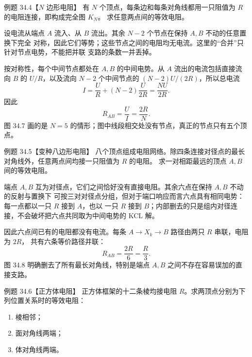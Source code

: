\Needspace{0.34\textheight}
\begin{origexamplebox}{例题 34.4【$N$ 边形电阻】}
有 $N$ 个顶点，每条边和每条对角线都用一只阻值为 $R$ 的电阻连接，即构成完全图 $K_N$。
求任意两点间的等效电阻。
\end{origexamplebox}

\begin{xesolution}
设电流从端点 $A$ 流入、从 $B$ 流出。其余 $N-2$ 个节点在保持 $A,B$ 不动的任意置换下完全
对称，因此它们等势；这些节点之间的电阻均无电流。这里的“合并”只针对节点电势，不能把并联
支路的条数一并丢掉。

按对称性，每个中间节点都处在 $A,B$ 的中间电势。从 $A$ 流出的电流包括直接流向 $B$ 的
$U/R$，以及流向 $N-2$ 个中间节点的 $(N-2)U/(2R)$，所以总电流
\[
  I=\frac UR+(N-2)\frac{U}{2R}=\frac{NU}{2R}.
\]
因此
\begin{equation}
  \boxed{R_{AB}=\frac UI=\frac{2R}{N}}.
\end{equation}
图 34.7 画的是 $N=5$ 的情形；图中线段相交处没有节点，真正的节点只有五个顶点。

\completeGraphDiagram
\end{xesolution}

\Needspace{0.38\textheight}
\begin{origexamplebox}{例题 34.5【变种八边形电阻】}
八个顶点组成电阻网络。除四条连接对径点的最长对角线外，任意两点间均接一只阻值为 $R$ 的电阻。
求一对相距最远的顶点 $A,B$ 间的等效电阻。
\end{origexamplebox}

\begin{xesolution}
端点 $A,B$ 互为对径点，它们之间恰好没有直接电阻。其余六点在保持 $A,B$ 不动的反射与置换下
可按三对对径点分组，但对于端口响应而言六点具有相同电势：每一点都以一只 $R$ 接到 $A$，也以
一只 $R$ 接到 $B$；内部删去的只是组内对径连接，不会破坏把六点共同取为中间电势的 KCL 解。

因此六点间已有的电阻都没有电流。每条 $A\to X_k\to B$ 路径由两只 $R$ 串联，电阻为 $2R$，
共有六条等价路径并联：
\begin{equation}
  \boxed{R_{AB}=\frac{2R}{6}=\frac R3}.
\end{equation}
图 34.8 明确删去了所有最长对角线，特别是端点 $A,B$ 之间不存在容易误加的直接支路。

\octagonDiagram
\end{xesolution}

\Needspace{0.42\textheight}
\begin{origexamplebox}{例题 34.6【正方体电阻】}
正方体框架的十二条棱均接电阻 $R$。求两顶点分别为下列位置关系时的等效电阻：
\begin{enumerate}[label=(\arabic*),leftmargin=2.2em]
  \item 棱相邻；
  \item 面对角线两端；
  \item 体对角线两端。
\end{enumerate}
\end{origexamplebox}

